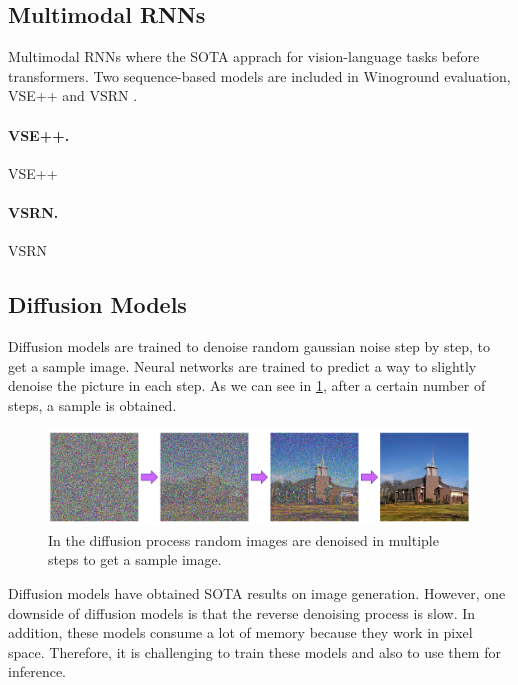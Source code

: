 \subsection{Multimodal RNNs} \label{sec:multimodal_rnns}

Multimodal RNNs where the SOTA apprach for vision-language tasks before transformers. Two sequence-based models are included in Winoground \cite{thrush2022winoground} evaluation, VSE++ \cite{faghri2018vse} and VSRN \cite{li2019vsrn}. 

\paragraph{VSE++.} VSE++ \cite{faghri2018vse} 

\paragraph{VSRN.} VSRN \cite{li2019vsrn}

\subsection{Diffusion Models} \label{sec:diffusion_models}

Diffusion models are trained to denoise random gaussian noise step by step, to get a sample image. Neural networks are trained to predict a way to slightly denoise the picture in each step. As we can see in \cref{fig:diffusion_process}, after a certain number of steps, a sample is obtained.

\begin{figure}[ht]
    \centering
    \includegraphics[width=\linewidth]{images/diffusion/diffusion-process.png}
    \caption{In the diffusion process random images are denoised in multiple steps to get a sample image.}
    \label{fig:diffusion_process}
\end{figure}

Diffusion models have obtained SOTA results on image generation. However, one downside of diffusion models is that the reverse denoising process is slow. In addition, these models consume a lot of memory because they work in pixel space. Therefore, it is challenging to train these models and also to use them for inference.

